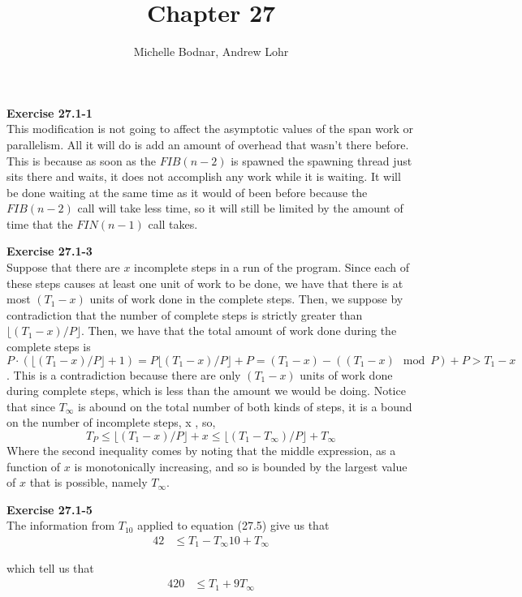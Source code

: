 \documentclass{article}
\title{Chapter 27}
\author{Michelle Bodnar, Andrew Lohr}
\begin{document}
\maketitle
\noindent\textbf{Exercise 27.1-1}\\
This modification is not going to affect the asymptotic values of the span work or parallelism. All it will do is add an amount of overhead that wasn't there before. This is because as soon as the $FIB(n-2)$ is spawned the spawning thread just sits there and waits, it does not accomplish any work while it is waiting. It will be done waiting at the same time as it would of been before because the $FIB(n-2)$ call will take less time, so it will still be limited by the amount of time that the $FIN(n-1)$ call takes.

\noindent\textbf{Exercise 27.1-3}\\
Suppose that there are $x$ incomplete steps in a run of the program. Since each of these steps causes at least one unit of work to be done, we have that there is at most $(T_1-x)$ units of work done in the complete steps. Then, we suppose by contradiction that the number of complete steps is strictly greater than $\lfloor (T_1-x)/P\rfloor$. Then, we have that the total amount of work done during the complete steps is $P\cdot (\lfloor (T_1-x)/P\rfloor + 1) = P\lfloor (T_1-x)/P\rfloor +P =  (T_1-x) - ((T_1-x)\mod P) + P > T_1-x$. This is a contradiction because there are only $(T_1-x)$ units of work done during complete steps, which is less than the amount we would be doing. Notice that since $T_\infty$ is abound on the total number of both kinds of steps, it is a bound on the number of incomplete steps, x , so, 
\[
T_P \le \lfloor (T_1-x)/P\rfloor +x \le \lfloor (T_1-T_{\infty})/P\rfloor +T_{\infty} 
\]
Where the second inequality comes by noting that the middle expression, as a function of $x$ is monotonically increasing, and so is bounded by the largest value of $x$ that is possible, namely $T_{\infty}$.

\noindent\textbf{Exercise 27.1-5}\\
The information from $T_{10}$ applied to equation (27.5) give us that
\begin{align*}
42 &\le {T_1 - T_\infty}{10} + T_\infty
\end{align*}

which tell us that 
\begin{align*}
420 &\le T_1 +9 T_\infty
\end{align*}
\end{document}
